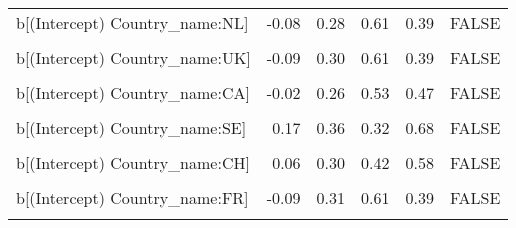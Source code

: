 \begin{table}
\begin{tabular}[t]{lrrrrl}
b[(Intercept) Country\_name:NL] & -0.08 & 0.28 & 0.61 & 0.39 & FALSE\\
\cellcolor{gray!10}{b[EPS Country\_name:NL]} & \cellcolor{gray!10}{-0.10} & \cellcolor{gray!10}{0.11} & \cellcolor{gray!10}{0.81} & \cellcolor{gray!10}{0.19} & \cellcolor{gray!10}{FALSE}\\
b[(Intercept) Country\_name:UK] & -0.09 & 0.30 & 0.61 & 0.39 & FALSE\\
\cellcolor{gray!10}{b[EPS Country\_name:UK]} & \cellcolor{gray!10}{-0.12} & \cellcolor{gray!10}{0.11} & \cellcolor{gray!10}{0.85} & \cellcolor{gray!10}{0.15} & \cellcolor{gray!10}{FALSE}\\
b[(Intercept) Country\_name:CA] & -0.02 & 0.26 & 0.53 & 0.47 & FALSE\\
\cellcolor{gray!10}{b[EPS Country\_name:CA]} & \cellcolor{gray!10}{-0.03} & \cellcolor{gray!10}{0.11} & \cellcolor{gray!10}{0.60} & \cellcolor{gray!10}{0.40} & \cellcolor{gray!10}{FALSE}\\
b[(Intercept) Country\_name:SE] & 0.17 & 0.36 & 0.32 & 0.68 & FALSE\\
\cellcolor{gray!10}{b[EPS Country\_name:SE]} & \cellcolor{gray!10}{0.22} & \cellcolor{gray!10}{0.12} & \cellcolor{gray!10}{0.03} & \cellcolor{gray!10}{0.97} & \cellcolor{gray!10}{TRUE}\\
b[(Intercept) Country\_name:CH] & 0.06 & 0.30 & 0.42 & 0.58 & FALSE\\
\cellcolor{gray!10}{b[EPS Country\_name:CH]} & \cellcolor{gray!10}{0.08} & \cellcolor{gray!10}{0.11} & \cellcolor{gray!10}{0.23} & \cellcolor{gray!10}{0.77} & \cellcolor{gray!10}{FALSE}\\
b[(Intercept) Country\_name:FR] & -0.09 & 0.31 & 0.61 & 0.39 & FALSE\\
\cellcolor{gray!10}{b[EPS Country\_name:FR]} & \cellcolor{gray!10}{-0.11} & \cellcolor{gray!10}{0.11} & \cellcolor{gray!10}{0.85} & \cellcolor{gray!10}{0.15} & \cellcolor{gray!10}{FALSE}\\
\bottomrule
\end{tabular}
\end{table}
